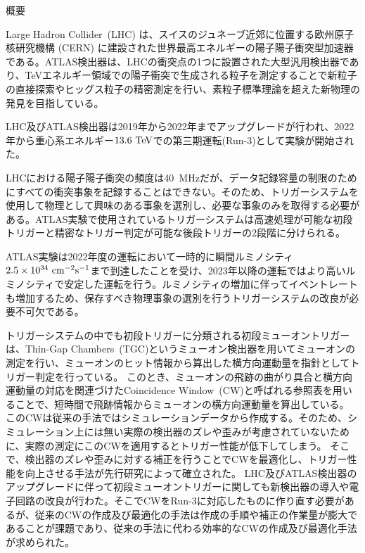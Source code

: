 \begin{center}
  \begin{huge}
    概要
  \end{huge}
\end{center}

\vspace{10pt}

Large Hadron Collider~(LHC) は、スイスのジュネーブ近郊に位置する欧州原子核研究機構 (CERN) に建設された世界最高エネルギーの陽子陽子衝突型加速器である。ATLAS検出器は、LHCの衝突点の1つに設置された大型汎用検出器であり、TeVエネルギー領域での陽子衝突で生成される粒子を測定することで新粒子の直接探索やヒッグス粒子の精密測定を行い、素粒子標準理論を超えた新物理の発見を目指している。

LHC及びATLAS検出器は2019年から2022年までアップグレードが行われ、2022年から重心系エネルギー$13.6~{\rm TeV}$での第三期運転(Run-3)として実験が開始された。

LHCにおける陽子陽子衝突の頻度は40~MHzだが、データ記録容量の制限のためにすべての衝突事象を記録することはできない。そのため、トリガーシステムを使用して物理として興味のある事象を選別し、必要な事象のみを取得する必要がある。ATLAS実験で使用されているトリガーシステムは高速処理が可能な初段トリガーと精密なトリガー判定が可能な後段トリガーの2段階に分けられる。

ATLAS実験は2022年度の運転において一時的に瞬間ルミノシティ$2.5\times10^{34}~{\rm cm^{-2}s^{-1}}$まで到達したことを受け、2023年以降の運転ではより高いルミノシティで安定した運転を行う。ルミノシティの増加に伴ってイベントレートも増加するため、保存すべき物理事象の選別を行うトリガーシステムの改良が必要不可欠である。

トリガーシステムの中でも初段トリガーに分類される初段ミューオントリガーは、Thin-Gap Chambers~(TGC)というミューオン検出器を用いてミューオンの測定を行い、ミューオンのヒット情報から算出した横方向運動量を指針としてトリガー判定を行っている。
このとき、ミューオンの飛跡の曲がり具合と横方向運動量の対応を関連づけたCoincidence Window~(CW)と呼ばれる参照表を用いることで、短時間で飛跡情報からミューオンの横方向運動量を算出している。
このCWは従来の手法ではシミュレーションデータから作成する。そのため、シミュレーション上には無い実際の検出器のズレや歪みが考慮されていないために、実際の測定にこのCWを適用するとトリガー性能が低下してしまう。
そこで、検出器のズレや歪みに対する補正を行うことでCWを最適化し、トリガー性能を向上させる手法が先行研究によって確立された。
LHC及びATLAS検出器のアップグレードに伴って初段ミューオントリガーに関しても新検出器の導入や電子回路の改良が行わた。そこでCWをRun-3に対応したものに作り直す必要があるが、従来のCWの作成及び最適化の手法は作成の手順や補正の作業量が膨大であることが課題であり、従来の手法に代わる効率的なCWの作成及び最適化手法が求められた。

